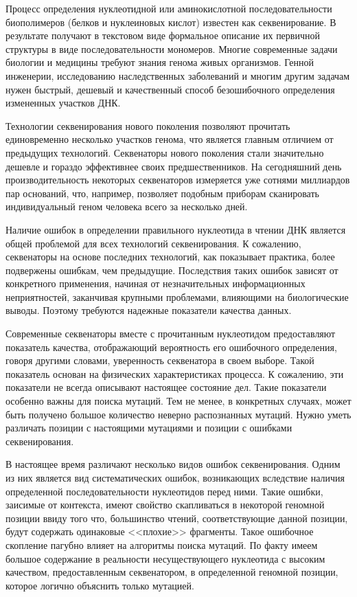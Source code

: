 \startprefacepage


Процесс определения нуклеотидной или аминокислотной последовательности биополимеров (белков и нуклеиновых кислот) известен как секвенирование. В результате получают в текстовом виде формальное описание их первичной структуры в виде последовательности мономеров. Многие современные задачи биологии и медицины требуют знания генома живых организмов. Генной инженерии, исследованию наследственных заболеваний и многим другим задачам нужен быстрый, дешевый и качественный способ безошибочного определения измененных участков ДНК.

Технологии секвенирования нового поколения позволяют прочитать единовременно несколько участков генома, что является главным отличием от предыдущих технологий. Секвенаторы нового поколения стали значительно дешевле и гораздо эффективнее своих предшественников. На сегодняшний день производительность некоторых секвенаторов измеряется уже сотнями миллиардов пар оснований, что, например, позволяет подобным приборам сканировать индивидуальный геном человека всего за несколько дней.

Наличие ошибок в определении правильного нуклеотида в чтении ДНК является общей проблемой для всех технологий секвенирования. К сожалению, секвенаторы на основе последних технологий, как показывает практика, более подвержены ошибкам, чем предыдущие. Последствия таких ошибок зависят от конкретного применения,
начиная от незначительных информационных неприятностей, заканчивая крупными проблемами, влияющими
на биологические выводы. Поэтому требуются надежные показатели качества данных.

Современные секвенаторы вместе с прочитанным нуклеотидом предоставляют показатель качества, отображающий вероятность его ошибочного определения, говоря другими словами, уверенность секвенатора в своем выборе. Такой показатель основан на физических характеристиках процесса. 
К сожалению, эти показатели не всегда описывают настоящее состояние дел. Такие показатели особенно важны для поиска мутаций. Тем не менее, в конкретных случаях, может быть получено большое количество неверно распознанных мутаций. Нужно уметь различать позиции с настоящими  мутациями и позиции с ошибками секвенирования.

В настоящее время различают несколько видов ошибок секвенирования. Одним из них является вид систематических ошибок, возникающих вследствие наличия определенной последовательности нуклеотидов перед ними.  Такие ошибки, заисимые от контекста, имеют свойство скапливаться в некоторой геномной позиции ввиду того что, большинство чтений,  соответствующие данной позиции, будут содержать одинаковые <<плохие>> фрагменты. Такое ошибочное скопление пагубно влияет на алгоритмы поиска мутаций. По факту имеем большое содержание в реальности несуществующего нуклеотида с высоким качеством, предоставленным секвенатором, в определенной геномной позиции, которое логично объяснить только мутацией.

